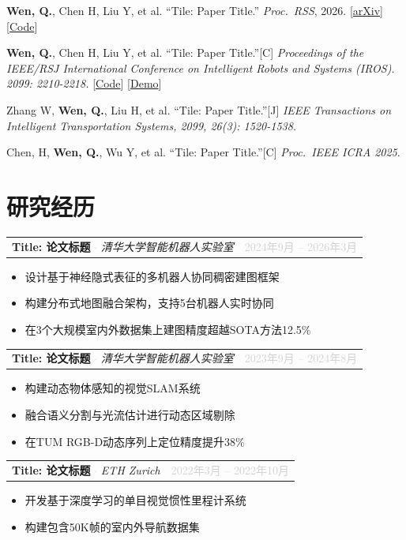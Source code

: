 \documentclass[10pt, letterpaper]{article}
\makeatletter
\newcommand{\entry}[3]{%
  \begin{tabularx}{\linewidth}{@{}X r@{}}
    \textbf{#1} \textcolor{lightgray}{$\cdot$} \textit{#2} &
    {\small\textcolor{lightgray}{#3}}
  \end{tabularx}\vspace{1pt}%
}
\makeatother
\begin{document}
\begin{enumerate}[label={\small[\arabic*]}, itemsep=3pt, topsep=0pt]

\item \textbf{Wen, Q.}, Chen H, Liu Y, et al.
    ``Tile: Paper Title.''
    \textit{Proc.\ RSS}, 2026.
    [\href{https://arxiv.org/}{arXiv}][\href{https://github.com/}{Code}]

\item \textbf{Wen, Q.}, Chen H, Liu Y, et al.
    ``Tile: Paper Title.''[C]
    \textit{Proceedings of the IEEE/RSJ International Conference on Intelligent Robots and Systems (IROS). 2099: 2210-2218.}
    [\href{https://github.com/}{Code}]
    [\href{https://}{Demo}]

\item Zhang W, \textbf{Wen, Q.}, Liu H, et al.
    ``Tile: Paper Title.''[J]
    \textit{IEEE Transactions on Intelligent Transportation Systems, 2099, 26(3): 1520-1538.}

\item Chen, H, \textbf{Wen, Q.}, Wu Y, et al.
    ``Tile: Paper Title.''[C]
   \textit{Proc.\ IEEE ICRA 2025}.

\end{enumerate}
\section{研究经历}


\entry{Title: 论文标题}{清华大学智能机器人实验室}{2024年9月 -- 2026年3月}
\begin{itemize}
\item 设计基于神经隐式表征的多机器人协同稠密建图框架
\item 构建分布式地图融合架构，支持5台机器人实时协同
\item 在3个大规模室内外数据集上建图精度超越SOTA方法12.5\%
\end{itemize}

\entry{Title: 论文标题}{清华大学智能机器人实验室}{2023年9月 -- 2024年8月}
\begin{itemize}
\item 构建动态物体感知的视觉SLAM系统
\item 融合语义分割与光流估计进行动态区域剔除
\item 在TUM RGB-D动态序列上定位精度提升38\%
\end{itemize}

\entry{Title: 论文标题}{ETH Zurich}{2022年3月 -- 2022年10月}
\begin{itemize}
\item 开发基于深度学习的单目视觉惯性里程计系统
\item 构建包含50K帧的室内外导航数据集
\end{itemize}
\end{document}
